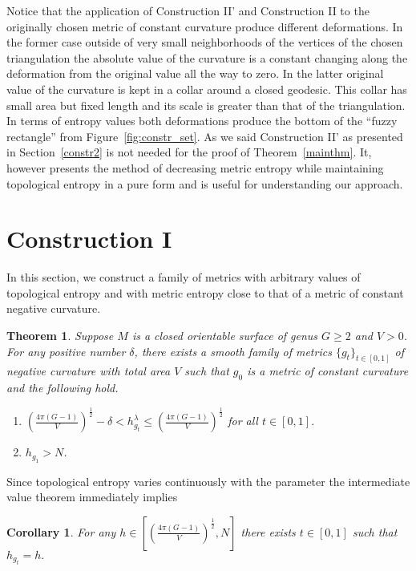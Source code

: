 \documentclass[12pt]{article}
\numberwithin{equation}{section}
\newtheorem{thm}{Theorem}
\newtheorem{cor}[lem]{Corollary}
\theoremstyle{definition}
\begin{document}
Notice that the application of Construction II' and Construction II to the originally chosen metric of constant curvature produce different deformations. In the former case  outside of very small neighborhoods of the vertices of the chosen triangulation the absolute value of the curvature is a constant changing along the deformation from the original value all the way to zero. In the latter original value of the curvature is kept in a collar around a closed  geodesic. This collar has small area but fixed length and its scale is greater than that of the triangulation. In terms of entropy values both deformations produce the bottom of  the ``fuzzy  rectangle''  from Figure~\ref{fig:constr_set}. As we said Construction II' as presented in Section~\ref{constr2} is not needed for the proof of Theorem~\ref{mainthm}. It, however presents the method of decreasing metric entropy while  maintaining topological entropy in a pure form and is useful for understanding our approach. 

\section{Construction I}\label{constr1}

In this section, we construct a family of metrics with arbitrary values of topological entropy and with metric entropy close to that of a metric of constant negative curvature.


\begin{thm}\label{thm:incr_top_entropy}
Suppose $M$ is a closed  orientable surface of genus $G\geq 2$ and $V>0$. For any positive number $\delta$, there exists a smooth family of metrics $\{g_t\}_{t\in[0,1]}$ of negative curvature with total area $V$ such that $g_0$ is a metric of constant curvature and the following hold.
\begin{enumerate}
\item $\left(\frac{4\pi(G-1)}{V}\right)^{\frac{1}{2}}-\delta<h^\lambda_{g_t}\leqslant \left(\frac{4\pi(G-1)}{V}\right)^{\frac{1}{2}}$ for all $t\in [0,1]$.
\item $h_{g_1}>N$.
\end{enumerate}
\end{thm}

Since topological entropy varies continuously with the parameter the intermediate value theorem immediately implies

\begin{cor} For any $h\in[\left(\frac{4\pi(G-1)}{V}\right)^{\frac{1}{2}}, N]$ there exists $t\in [0,1]$ such that $h_{g_t} = h.$
\end{cor}
\end{document}
